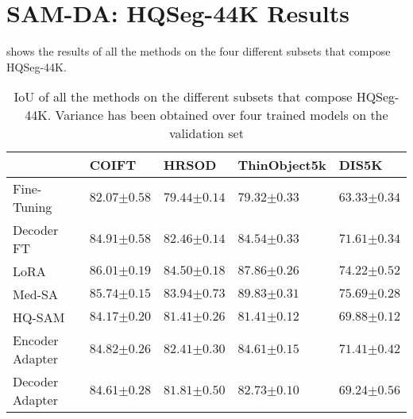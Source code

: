 \section{SAM-DA: HQSeg-44K Results}

 shows the results of all the methods on the four different subsets that compose HQSeg-44K.

\begin{table*}[htbp!]
\centering
\caption{IoU of all the methods on the different subsets that compose HQSeg-44K. Variance has been obtained over four trained models on the validation set}
\label{tab:hqseg_results_samda}
\begin{tabular}{@{}lP{2.2cm}P{2.2cm}P{2.2cm}P{2.2cm}@{}}
\toprule
 & COIFT & HRSOD & ThinObject5k & DIS5K \\ \midrule
Fine-Tuning & $82.07{\scriptscriptstyle \pm 0.58}$ & $79.44{\scriptscriptstyle \pm 0.14}$ & $79.32{\scriptscriptstyle \pm 0.33}$ & $63.33{\scriptscriptstyle \pm 0.34}$ \\
Decoder FT & $84.91{\scriptscriptstyle \pm 0.58}$ & $82.46{\scriptscriptstyle \pm 0.14}$ & $84.54{\scriptscriptstyle \pm 0.33}$ & $71.61{\scriptscriptstyle \pm 0.34}$ \\
LoRA & $86.01{\scriptscriptstyle \pm 0.19}$ & $84.50{\scriptscriptstyle \pm 0.18}$ & $87.86{\scriptscriptstyle \pm 0.26}$ & $74.22{\scriptscriptstyle \pm 0.52}$ \\
Med-SA & $85.74{\scriptscriptstyle \pm 0.15}$ & $83.94{\scriptscriptstyle \pm 0.73}$ & $89.83{\scriptscriptstyle \pm 0.31}$ & $75.69{\scriptscriptstyle \pm 0.28}$ \\
HQ-SAM & $84.17{\scriptscriptstyle \pm 0.20}$ & $81.41{\scriptscriptstyle \pm 0.26}$ & $81.41{\scriptscriptstyle \pm 0.12}$ & $69.88{\scriptscriptstyle \pm 0.12}$ \\ \midrule
Encoder Adapter & $84.82{\scriptscriptstyle \pm 0.26}$ & $82.41{\scriptscriptstyle \pm 0.30}$ & $84.61{\scriptscriptstyle \pm 0.15}$ & $71.41{\scriptscriptstyle \pm 0.42}$ \\
Decoder Adapter & $84.61{\scriptscriptstyle \pm 0.28}$ & $81.81{\scriptscriptstyle \pm 0.50}$ & $82.73{\scriptscriptstyle \pm 0.10}$ & $69.24{\scriptscriptstyle \pm 0.56}$ \\ \bottomrule
\end{tabular}

\end{table*}